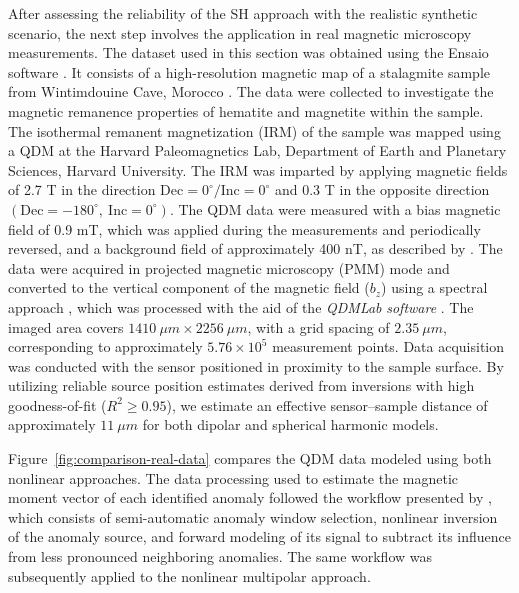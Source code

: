 After assessing the reliability of the SH approach with the realistic synthetic scenario, the next step involves the application in real magnetic microscopy measurements. The dataset used in this section was obtained using the Ensaio software \citep{Ensaio2025}. It consists of a high-resolution magnetic map of a stalagmite sample from Wintimdouine Cave, Morocco \citep{carmo2019speleothem}. The data were collected to investigate the magnetic remanence properties of hematite and magnetite within the sample.
The isothermal remanent magnetization (IRM) of the sample was mapped using a QDM at the Harvard Paleomagnetics Lab, Department of Earth and Planetary Sciences, Harvard University. The IRM was imparted by applying magnetic fields of 2.7 T in the direction $\mathrm{Dec}=0^\circ/\mathrm{Inc}=0^\circ$  and 0.3 T in the opposite direction $(\mathrm{Dec}=-180^\circ,\ \mathrm{Inc}=0^\circ)$. The QDM data were measured with a bias magnetic field of 0.9 mT, which was applied during the measurements and periodically reversed, and a background field of approximately 400 nT, as described by \citet{Hess2024}. The data were acquired in projected magnetic microscopy (PMM) mode and converted to the vertical component of the magnetic field ($b_z$) using a spectral approach \citep{Fu2020, Glenn2017, Lima2009}, which was processed with the aid of the \textit{QDMLab} \textit{software} \citep{Volk2022}. The imaged area covers $1410~\mu m \times 2256~\mu m$, with a grid spacing of $2.35~\mu m$, corresponding to approximately $5.76 \times 10^5$ measurement points. Data acquisition was conducted with the sensor positioned in proximity to the sample surface. By utilizing reliable source position estimates derived from inversions with high goodness-of-fit ($R^2 \ge 0.95$), we estimate an effective sensor--sample distance of approximately $11~\mu m$ for both dipolar and spherical harmonic models.

Figure~\ref{fig:comparison-real-data} compares the QDM data modeled using both nonlinear approaches. The data processing used to estimate the magnetic moment vector of each identified anomaly followed the workflow presented by \citet{SouzaJunior2026}, which consists of semi-automatic anomaly window selection, nonlinear inversion of the anomaly source, and forward modeling of its signal to subtract its influence from less pronounced neighboring anomalies. The same workflow was subsequently applied to the nonlinear multipolar approach. 

